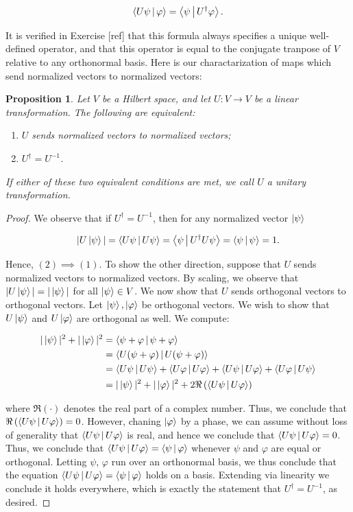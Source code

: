 \documentclass{article}
\newtheorem{proposition}{Proposition}[section]
\theoremstyle{definition}
\numberwithin{figure}{section}
\begin{document}
$$\Braket{ U \psi  | \varphi}=\Braket{\psi | U^\dagger \varphi}.$$

It is verified in Exercise [ref] that this formula always specifies a unique well-defined operator, and that this operator is equal to the conjugate tranpose of $V$ relative to any orthonormal basis. Here is our charactarization of maps which send normalized vectors to normalized vectors:

\begin{proposition}\label{unitary equivilance} Let $V$ be a Hilbert space, and let $U:V\to V$ be a linear transformation. The following are equivalent:

\begin{enumerate}
\item $U$ sends normalized vectors to normalized vectors;
\item $U^{\dagger}=U^{-1}$.
\end{enumerate}

If either of these two equivalent conditions are met, we call $U$ a unitary transformation.
\end{proposition}
\begin{proof} We observe that if $U^\dagger=U^{-1}$, then for any normalized vector $\ket{\psi}$

$$|U\ket{\psi}|=\Braket{U \psi | U \psi}=\Braket{\psi | U^\dagger U \psi}=\Braket{\psi | \psi} =1.$$

Hence, $(2)\implies (1)$. To show the other direction, suppose that $U$ sends normalized vectors to normalized vectors. By scaling, we observe that $|U\ket{\psi}|=|\ket{\psi}|$ for all $\ket{\psi}\in V$. We now show that $U$ sends orthogonal vectors to orthogonal vectors. Let $\ket{\psi},\ket{\varphi}$ be orthogonal vectors. We wish to show that $U\ket{\psi}$ and $U\ket{\varphi}$ are orthogonal as well. We compute:

\begin{align*}
|\ket{\psi}|^2+|\ket{\varphi}|^2&=\Braket{\psi+\varphi | \psi+ \varphi}\\
&=\Braket{U(\psi+\varphi) | U(\psi+ \varphi)}\\
&=\Braket{U\psi | U\psi}+\Braket{U\varphi | U \varphi}+\Braket{U\psi | U\varphi}+\Braket{U\varphi | U\psi}\\
&=|\ket{\psi}|^2+|\ket{\varphi}|^2+2\Re\left(\Braket{U\psi | U\varphi}\right)\\
\end{align*}

where $\Re(\cdot)$ denotes the real part of a complex number. Thus, we conclude that $\Re\left(\Braket{U\psi | U\varphi}\right)=0$. However, chaning $\ket{\varphi}$ by a phase, we can assume without loss of generality that $\Braket{U\psi | U\varphi}$ is real, and hence we conclude that $\Braket{U\psi | U\varphi}=0$. Thus, we conclude that $\Braket{U\psi | U\varphi}=\Braket{\psi | \varphi}$ whenever $\psi$ and $\varphi$ are equal or orthogonal. Letting $\psi$, $\varphi$ run over an orthonormal basis, we thus conclude that the equation $\Braket{U\psi | U\varphi}=\Braket{\psi | \varphi}$ holds on a basis. Extending via linearity we conclude it holds everywhere, which is exactly the statement that $U^\dagger=U^{-1}$, as desired. 
\end{proof}
\end{document}
